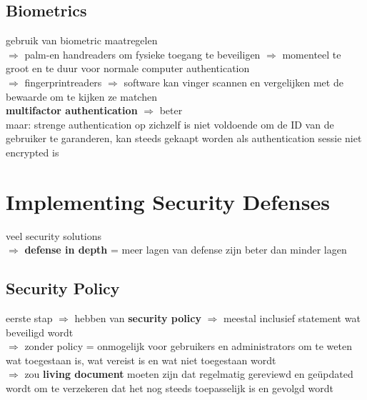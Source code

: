 \documentclass{report}
\begin{document}
\subsection{Biometrics}
gebruik van biometric maatregelen
\\$\Rightarrow$ palm-en handreaders om fysieke toegang te beveiligen $\Rightarrow$ momenteel te groot en te duur voor normale computer authentication
\\$\Rightarrow$ fingerprintreaders $\Rightarrow$ software kan vinger scannen en vergelijken met de bewaarde om te kijken ze matchen
\\\textbf{multifactor authentication} $\Rightarrow$ beter
\\ maar: strenge authentication op zichzelf is niet voldoende om de ID van de gebruiker te garanderen, kan  steeds gekaapt worden als authentication sessie niet encrypted is

\section{Implementing Security Defenses}
veel security solutions
\\ $\Rightarrow$ \textbf{defense in depth} = meer lagen van defense zijn beter dan minder lagen
\subsection{Security Policy}
eerste stap $\Rightarrow$ hebben van \textbf{security policy} $\Rightarrow$ meestal inclusief statement wat beveiligd wordt
\\$\Rightarrow$ zonder policy = onmogelijk voor gebruikers en administrators om te weten wat toegestaan is, wat vereist is en wat niet toegestaan wordt
\\$\Rightarrow$ zou \textbf{living document} moeten zijn dat regelmatig gereviewd en ge\"updated wordt om te verzekeren dat het nog steeds toepasselijk is en gevolgd wordt
\end{document}
